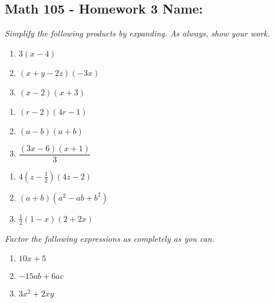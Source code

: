 \documentclass[11pt]{article}
\begin{document}
\pagestyle{empty}
\subsection*{Math 105 - Homework 3 \hfill Name: \underline{\hspace*{2in}}}
\textit{Simplify the following products by expanding.  As always, show your work.} %

\begin{multicols}{3}
\begin{enumerate}
\item $3(x-4)$ 
\item $(x+y-2z)(-3x)$ 
\item $(x-2)(x+3)$
\setcounter{enumCount}{\theenumi}
\end{enumerate}
\end{multicols}
\vfill

\begin{multicols}{3}
\begin{enumerate}
\setcounter{enumi}{\theenumCount}
\item $(r-2)(4r-1)$ 
\item $(a-b)(a+b)$ 
\item $\dfrac{(3x-6)(x+1)}{3}$ 
\setcounter{enumCount}{\theenumi}
\end{enumerate}
\end{multicols}
\vfill

\begin{multicols}{3}
\begin{enumerate}
\setcounter{enumi}{\theenumCount}
\item $4(z-\tfrac{1}{2})(4z-2)$ 
\item $(a+b)(a^2 - ab + b^2)$ 
\item $\tfrac{1}{2}(1-x)(2+2x)$ 
\setcounter{enumCount}{\theenumi}
\end{enumerate}
\end{multicols}
\vfill


\noindent
\textit{Factor the following expressions as completely as you can. }
\begin{multicols}{3}
\begin{enumerate}
\setcounter{enumi}{\theenumCount}
\item $10x+5$
\item $-15 a b + 6 a c$
\item $3x^2 + 2xy$ 
\setcounter{enumCount}{\theenumi}
\end{enumerate}
\end{multicols}
\vfill
\end{document}
